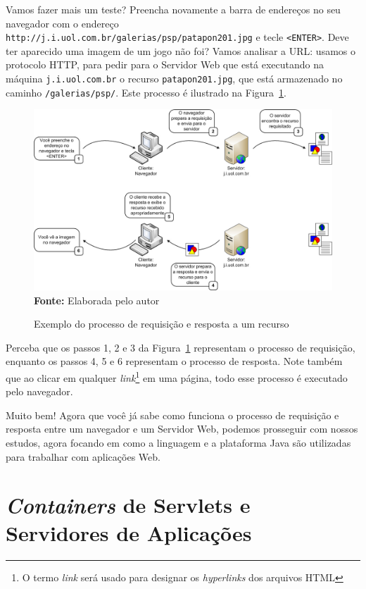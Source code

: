 Vamos fazer mais um teste? Preencha novamente a barra de endereços no seu navegador com o endereço \texttt{http://j.i.uol.com.br/galerias/psp/patapon201.jpg} e tecle \texttt{<ENTER>}. Deve ter aparecido uma imagem de um jogo não foi? Vamos analisar a URL: usamos o protocolo HTTP, para pedir para o Servidor Web que está executando na máquina \texttt{j.i.uol.com.br} o recurso \texttt{patapon201.jpg}, que está armazenado no caminho \texttt{/galerias/psp/}. Este processo é ilustrado na Figura~\ref{fig:cap01ExemploRequestResponse}.

\FloatBarrier
\begin{figure}[!htbp]
    \centering
    \caption{Exemplo do processo de requisição e resposta a um recurso}
    \includegraphics[scale=0.38]{imagens/cap01ExemploRequestResponse}
    \\\textbf{Fonte:} Elaborada pelo autor
    \label{fig:cap01ExemploRequestResponse}
\end{figure}
\FloatBarrier

Perceba que os passos 1, 2 e 3 da Figura~\ref{fig:cap01ExemploRequestResponse} representam o processo de requisição, enquanto os passos 4, 5 e 6 representam o processo de resposta. Note também que ao clicar em qualquer \textit{link}\footnote{O termo \textit{link} será usado para designar os \textit{hyperlinks} dos arquivos HTML} em uma página, todo esse processo é executado pelo navegador.

Muito bem! Agora que você já sabe como funciona o processo de requisição e resposta entre um navegador e um Servidor Web, podemos prosseguir com nossos estudos, agora focando em como a linguagem e a plataforma Java são utilizadas para trabalhar com aplicações Web.


\section{\textit{Containers} de Servlets e Servidores de Aplicações}

